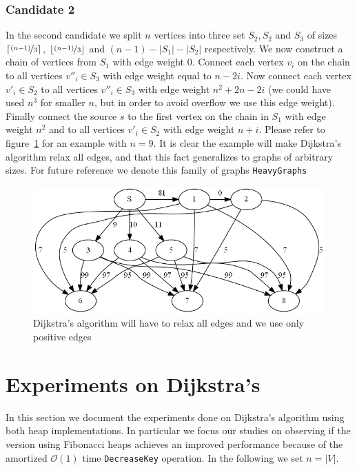 \documentclass[a4paper,oneside,article,11pt]{memoir}
\begin{document}
\subsection{Candidate 2}
In the second candidate we split $n$ vertices into three set $S_2, S_2$ and $S_3$ of sizes $\lceil \nicefrac{(n-1)}{3} \rceil$, $\lfloor \nicefrac{(n-1)}{3} \rfloor$ and $(n-1) - \lvert S_1 \rvert - \lvert S_2 \rvert$ respectively. We now construct a chain of vertices from $S_1$ with edge weight $0$. Connect each vertex $v_i$ on the chain to all vertices ${v''}_i \in S_3$ with edge weight equal to $n-2i$. Now connect each vertex ${v'}_i \in S_2$ to all vertices ${v''}_i \in S_3$ with edge weight $n^2 + 2n - 2i$ (we could have used $n^3$ for smaller $n$, but in order to avoid overflow we use this edge weight). Finally connect the source $s$ to the first vertex on the chain in $S_1$ with edge weight $n^2$ and to all vertices ${v'}_i \in S_2$ with edge weight $n+i$. Please refer to figure~\ref{figure:graph_pos_weights} for an example with $n=9$.  It is clear the example will make Dijkstra's algorithm relax all edges, and that this fact generalizes to graphs of arbitrary sizes. For future reference we denote this family of graphs \texttt{HeavyGraphs}

\begin{figure}[H]
\centering
\centerline {
\includegraphics[scale=0.65]{../figures/graph_positive_weights.png}
}
\caption{Dijkstra's algorithm will have to relax all edges and we use only positive edges}
\label{figure:graph_pos_weights}
\end{figure}

\chapter{Experiments on Dijkstra's}
\label{cpt:dijksta_experiments}
In this section we document the experiments done on Dijkstra's algorithm using both heap implementations. In particular we focus our studies on observing if the version using Fibonacci heaps achieves an improved performance because of the amortized $\mathcal{O}(1)$ time \texttt{DecreaseKey} operation. In the following we set $n = \lvert V \lvert$.
\end{document}
